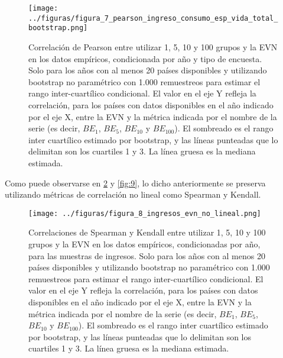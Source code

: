 \begin{figure}[H] %
    \centering %
    \texttt{[image: ../figuras/figura\_7\_pearson\_ingreso\_consumo\_esp\_vida\_total\_bootstrap.png]} %
    \caption{Correlación de Pearson entre utilizar 1, 5, 10 y 100 grupos y la EVN en los datos empíricos, condicionada por año y tipo de encuesta. Solo para los años con al menos 20 países disponibles y utilizando bootstrap no paramétrico con 1.000 remuestreos para estimar el rango inter-cuartílico condicional. El valor en el eje Y refleja la correlación, para los países con datos disponibles en el año indicado por el eje X, entre la EVN y la métrica indicada por el nombre de la serie (es decir, $BE_1$, $BE_5$, $BE_{10}$ y $BE_{100}$). El sombreado es el rango inter cuartílico estimado por bootstrap, y las líneas punteadas que lo delimitan son los cuartiles 1 y 3. La línea gruesa es la mediana estimada.}
    \label{fig:7} %
\end{figure}

Como puede observarse en \ref{fig:8} y \ref{fig:9}, lo dicho anteriormente se preserva utilizando métricas de correlación no lineal como Spearman y Kendall.

\begin{figure}[H] %
    \centering %
    \texttt{[image: ../figuras/figura\_8\_ingresos\_evn\_no\_lineal.png]} %
    \caption{Correlaciones de Spearman y Kendall entre utilizar 1, 5, 10 y 100 grupos y la EVN en los datos empíricos, condicionadas por año, para las muestras de ingresos. Solo para los años con al menos 20 países disponibles y utilizando bootstrap no paramétrico con 1.000 remuestreos para estimar el rango inter-cuartílico condicional. El valor en el eje Y refleja la correlación, para los países con datos disponibles en el año indicado por el eje X, entre la EVN y la métrica indicada por el nombre de la serie (es decir, $BE_1$, $BE_5$, $BE_{10}$ y $BE_{100}$). El sombreado es el rango inter cuartílico estimado por bootstrap, y las líneas punteadas que lo delimitan son los cuartiles 1 y 3. La línea gruesa es la mediana estimada.}
    \label{fig:8} %
\end{figure}



